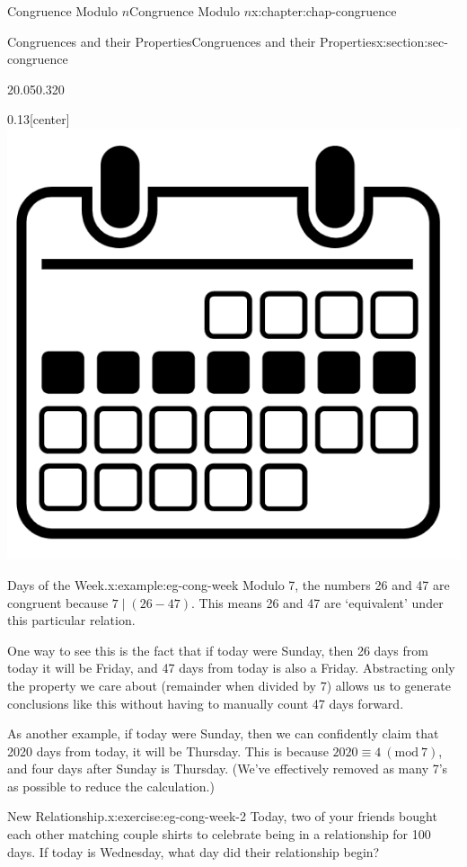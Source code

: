 \documentclass[oneside,10pt,]{book}
\numberwithin{equation}{section}
\newcommand{\Mod}[1]{\ \left(\mathrm{mod}\ #1\right)}
\begin{document}
\begin{chapterptx}{Congruence Modulo \(n\)}{}{Congruence Modulo \(n\)}{}{}{x:chapter:chap-congruence}
\begin{sectionptx}{Congruences and their Properties}{}{Congruences and their Properties}{}{}{x:section:sec-congruence}
\begin{sidebyside}{2}{0.05}{0.32}{0}
\begin{sbspanel}{0.13}[center]
\includegraphics[width=\linewidth]{figs/noun_week_247256.png}
\end{sbspanel}%
\end{sidebyside}%
\begin{example}{Days of the Week.}{x:example:eg-cong-week}%
Modulo 7, the numbers 26 and 47 are congruent because \(7 \mid (26-47)\). This means 26 and 47 are `equivalent' under this particular relation.%
\par
One way to see this is the fact that if today were Sunday, then 26 days from today it will be Friday, and 47 days from today is also a Friday. Abstracting only the property we care about (remainder when divided by 7) allows us to generate conclusions like this without having to manually count 47 days forward.%
\par
As another example, if today were Sunday, then we can confidently claim that 2020 days from today, it will be Thursday. This is because \(2020 \equiv 4 \Mod{7}\), and four days after Sunday is Thursday. (We've effectively removed as many 7's as possible to reduce the calculation.)%
\end{example}
\begin{inlineexercise}{New Relationship.}{x:exercise:eg-cong-week-2}%
Today, two of your friends bought each other matching couple shirts to celebrate being in a relationship for 100 days. If today is Wednesday, what day did their relationship begin?%

\end{inlineexercise}
\end{sectionptx}
\end{chapterptx}
\end{document}
